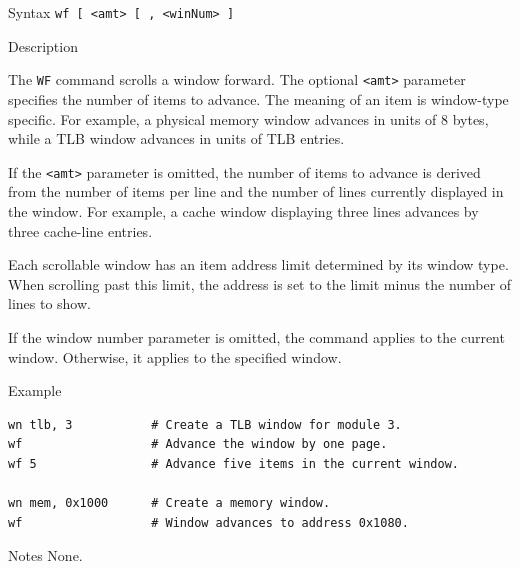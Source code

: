%
%
\pagebreak
{}

\begin{iPageDescEntry}{Syntax}
\texttt{wf [ <amt> [ , <winNum> ]} \\
\end{iPageDescEntry}

\begin{iPageDescEntry}{Description}

The \texttt{WF} command scrolls a window forward.
The optional \texttt{<amt>} parameter specifies the number of items to advance. The meaning of an item is window-type specific. For example, a physical memory window advances in units of 8 bytes, while a TLB window advances in units of TLB entries.

If the \texttt{<amt>} parameter is omitted, the number of items to advance is derived from the number of items per line and the number of lines currently displayed in the window. For example, a cache window displaying three lines advances by three cache-line entries.

Each scrollable window has an item address limit determined by its window type. When scrolling past this limit, the address is set to the limit minus the number of lines to show.

If the window number parameter is omitted, the command applies to the current window. Otherwise, it applies to the specified window.

\end{iPageDescEntry}

\begin{iPageDescOpEntry}{Example}
\begin{lstlisting}[style=iPageOpStyle]
wn tlb, 3           # Create a TLB window for module 3.
wf                  # Advance the window by one page.
wf 5                # Advance five items in the current window.

wn mem, 0x1000      # Create a memory window.
wf                  # Window advances to address 0x1080.
\end{lstlisting}
\end{iPageDescOpEntry}

\begin{iPageDescEntry}{Notes}
None.
\end{iPageDescEntry}
